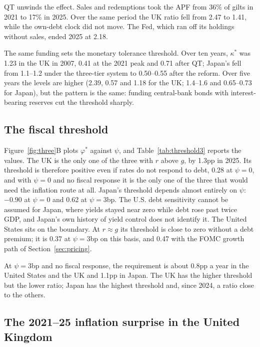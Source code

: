 QT unwinds the effect. Sales and redemptions took the APF from 36\% of gilts in 2021 to 17\% in 2025. Over the same period the UK ratio fell from 2.47 to 1.41, while the own-debt clock did not move. The Fed, which ran off its holdings without sales, ended 2025 at 2.18.

The same funding sets the monetary tolerance threshold. Over ten years, $\kappa^*$ was 1.23 in the UK in 2007, 0.41 at the 2021 peak and 0.71 after QT; Japan's fell from 1.1--1.2 under the three-tier system to 0.50--0.55 after the reform. Over five years the levels are higher (2.39, 0.57 and 1.18 for the UK; 1.4--1.6 and 0.65--0.73 for Japan), but the pattern is the same: funding central-bank bonds with interest-bearing reserves cut the threshold sharply.

\subsection{The fiscal threshold}\label{sec:intlthreshold}



Figure~\ref{fig:three}B plots $\varphi^*$ against $\psi$, and Table~\ref{tab:threshold3} reports the values. The UK is the only one of the three with $r$ above $g$, by 1.3pp in 2025. Its threshold is therefore positive even if rates do not respond to debt, 0.28 at $\psi=0$, and with $\psi=0$ and no fiscal response it is the only one of the three that would need the inflation route at all. Japan's threshold depends almost entirely on $\psi$: $-0.90$ at $\psi=0$ and 0.62 at $\psi=3$bp. The U.S. debt sensitivity cannot be assumed for Japan, where yields stayed near zero while debt rose past twice GDP, and Japan's own history of yield control does not identify it. The United States sits on the boundary. At $r\approx g$ its threshold is close to zero without a debt premium; it is 0.37 at $\psi=3$bp on this basis, and 0.47 with the FOMC growth path of Section~\ref{sec:pricing}.

At $\psi=3$bp and no fiscal response, the requirement is about 0.8pp a year in the United States and the UK and 1.1pp in Japan. The UK has the higher threshold but the lower ratio; Japan has the highest threshold and, since 2024, a ratio close to the others.

\subsection{The 2021--25 inflation surprise in the United Kingdom}\label{sec:uktest}

